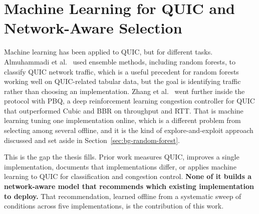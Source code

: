 \section{Machine Learning for QUIC and Network-Aware Selection}
\label{sec:rw-ml}

Machine learning has been applied to QUIC, but for different tasks.
Almuhammadi et al.~\cite{app2023quicensemble} used ensemble methods, including
random forests, to classify QUIC network traffic, which is a useful precedent
for random forests working well on QUIC-related tabular data, but the goal is
identifying traffic rather than choosing an implementation. Zhang et
al.~\cite{zhang2023pbq} went further inside the protocol with PBQ, a deep
reinforcement learning congestion controller for QUIC that outperformed Cubic
and BBR on throughput and RTT. That is machine learning tuning one
implementation online, which is a different problem from selecting among
several offline, and it is the kind of explore-and-exploit approach discussed
and set aside in Section~\ref{sec:bg-random-forest}.

This is the gap the thesis fills. Prior work measures QUIC, improves a single
implementation, documents that implementations differ, or applies machine
learning to QUIC for classification and congestion control. \textbf{None of it
builds a network-aware model that recommends which existing implementation to
deploy.} That recommendation, learned offline from a systematic sweep of
conditions across five implementations, is the contribution of this work.
